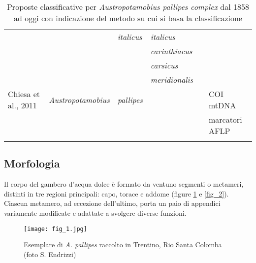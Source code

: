\documentclass[11pt,a4paper,italian,twoside,openany]{memoir}
\begin{document}
\begin{longtable}[c]{@{}llllll@{}}
\rowcolor[HTML]{EFEFEF} 
            & \textit{}      & \textit{italicus}     & \textit{italicus}     &       &     \\
\rowcolor[HTML]{EFEFEF} 
            & \textit{}      & \textit{}  & \textit{carinthiacus} &       &     \\
\rowcolor[HTML]{EFEFEF} 
            & \textit{}      & \textit{}  & \textit{carsicus}     &       &     \\
\rowcolor[HTML]{EFEFEF} 
            & \textit{}      & \textit{}  & \textit{meridionalis} &       &     \\
Chiesa et al., 2011    & \textit{Austropotamobius} & \textit{pallipes}     & \textit{}  &       & COI mtDNA\\
& & & & & marcatori AFLP\\* \bottomrule

\caption{Proposte classificative per \emph{Austropotamobius pallipes complex} dal 1858 ad oggi con indicazione del metodo su cui si basa la classificazione}
\label{tab_1}\\
\end{longtable}
\normalsize

\subsection{Morfologia}
Il corpo del gambero d'acqua dolce è formato da ventuno segmenti o metameri, distinti in tre regioni principali: capo, torace e addome (figure \ref{fig_1} e \ref{fig_2}). Ciascun metamero, ad eccezione dell'ultimo, porta un paio di appendici variamente modificate e adattate a svolgere diverse funzioni.

\begin{figure}
  \centering
  \texttt{[image: fig\_1.jpg]}
  \caption{Esemplare di \emph{A. pallipes} raccolto in Trentino, Rio Santa Colomba (foto S. Endrizzi)}
  \label{fig_1}
\end{figure}
\end{document}
